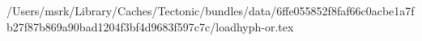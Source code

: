/Users/msrk/Library/Caches/Tectonic/bundles/data/6ffe055852f8faf66c0acbe1a7fb27f87b869a90bad1204f3bf4d9683f597c7c/loadhyph-or.tex